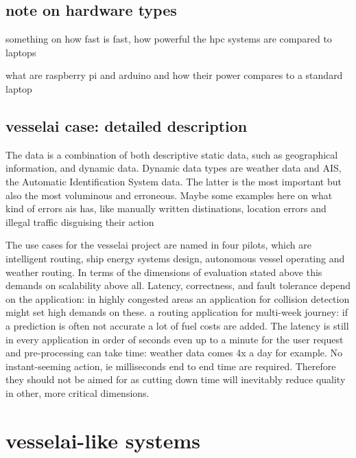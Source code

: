 \section{note on hardware types}

something on how fast is fast, how powerful the hpc systems are compared to laptops

what are raspberry pi and arduino and how their power compares to a standard laptop

\section{vesselai case: detailed description}

The data is a combination of both descriptive static data, such as geographical information, and dynamic data. Dynamic data types are weather data and AIS, the Automatic Identification System data. The latter is the most important but also the most voluminous and erroneous. Maybe some examples here on what kind of errors ais has, like manually written distinations, location errors and illegal traffic disguising their action


The use cases for the vesselai project are named in four pilots, which are intelligent routing, ship energy systems design, autonomous vessel operating and weather routing. In terms of the dimensions of evaluation stated above this demands on scalability above all. Latency, correctness, and fault tolerance depend on the application: in highly congested areas an application for collision detection might set high demands on these. a routing application for multi-week journey: if a prediction is often not accurate a lot of fuel costs are added. The latency is still in every application in order of seconds even up to a minute for the user request and pre-processing can take time: weather data comes 4x a day for example. No instant-seeming action, ie milliseconds end to end time are required. Therefore they should not be aimed for as cutting down time will inevitably reduce quality in other, more critical dimensions.

\chapter{vesselai-like systems}

